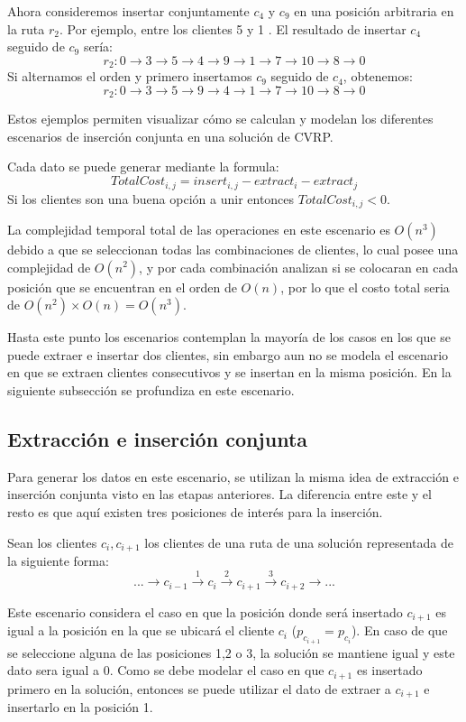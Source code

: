 \documentclass{article}
\begin{document}
Ahora consideremos insertar conjuntamente $ c_4 $ y $ c_9 $ en una posición arbitraria en la ruta $r_2 $. Por ejemplo, entre los clientes 5  y 1 . El resultado de insertar $ c_4 $ seguido de $ c_9 $ sería:  
\[
r_2: 0 \rightarrow 3 \rightarrow 5 \rightarrow 4 \rightarrow 9 \rightarrow 1 \rightarrow 7 \rightarrow 10 \rightarrow 8 \rightarrow 0
\]  
Si alternamos el orden y primero insertamos \( c_9 \) seguido de \( c_4 \), obtenemos:  
\[
r_2: 0 \rightarrow 3 \rightarrow 5 \rightarrow 9 \rightarrow 4 \rightarrow 1 \rightarrow 7 \rightarrow 10 \rightarrow 8 \rightarrow 0
\]  

Estos ejemplos permiten visualizar cómo se calculan y modelan los diferentes escenarios de inserción conjunta en una solución de CVRP.

Cada dato se puede generar mediante la formula:
\[ 
TotalCost_{i,j} = insert_{i,j} - extract_i - extract_j
 \]
Si los clientes son una buena opción a unir entonces $TotalCost_{i,j} < 0$.

La complejidad temporal total de las operaciones en este escenario es $O(n^3)$ debido a que se seleccionan todas las combinaciones de clientes, lo cual posee una complejidad de $O(n^2)$, y por cada combinación analizan si se colocaran en cada posición que se encuentran en el orden de $O(n)$, por lo que el costo total seria de $O(n^2) \times O(n) = O(n^3)$. 

Hasta este punto los escenarios contemplan la mayoría de los casos en los que se puede extraer e insertar dos clientes, sin embargo aun no se modela el escenario en que se extraen clientes consecutivos y se insertan en la misma posición. En la siguiente subsección se profundiza en este escenario.

\subsection{Extracción e inserción conjunta}

Para generar los datos en este escenario, se utilizan la misma idea de extracción e inserción conjunta visto en las etapas anteriores. La diferencia entre este y el resto es que aquí existen tres posiciones de interés para la inserción.

Sean los clientes $c_i,c_{i+1}$ los clientes de una ruta de una solución representada de la siguiente forma:
\[
... \rightarrow c_{i-1} \xrightarrow{1} c_i \xrightarrow{2} c_{i+1} \xrightarrow{3} c_{i+2} \rightarrow ...
\]

Este escenario considera el caso en que la posición donde será insertado $c_{i+1}$ es igual a la posición en la que se ubicará el cliente $c_i$ ($p_{c_{i+1}} = p_{c_i}$). En caso de que se seleccione alguna de las posiciones 1,2 o 3, la solución se mantiene igual y este dato sera igual a 0. Como se debe modelar el caso en que $c_{i+1}$ es insertado primero en la solución, entonces se puede utilizar el dato de extraer a $c_{i+1}$ e insertarlo en la posición 1.
\end{document}
